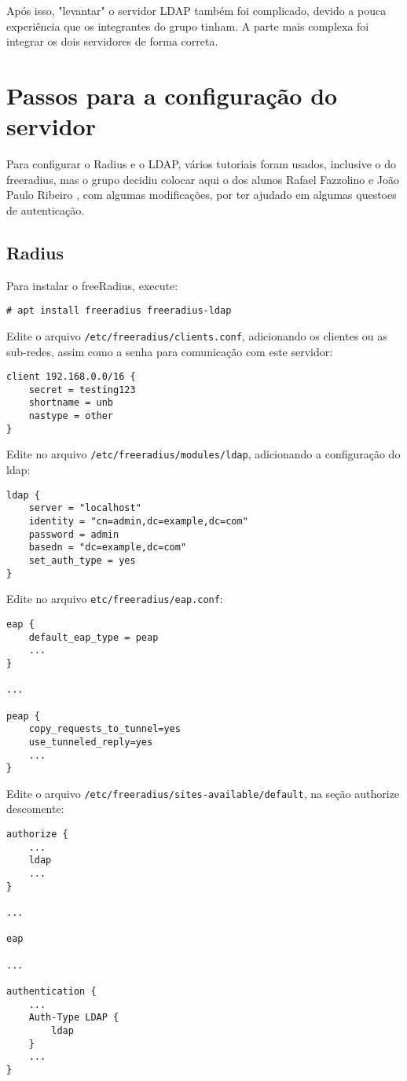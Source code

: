 Após isso, "levantar" o servidor LDAP também foi complicado, devido a pouca
experiência que os integrantes do grupo tinham.
A parte mais complexa foi integrar os dois servidores de forma correta.

\section{Passos para a configuração do servidor}

Para configurar o Radius e o LDAP, vários tutoriais foram usados, inclusive o do
freeradius, mas o grupo decidiu colocar aqui o dos alunos Rafael Fazzolino e João Paulo
Ribeiro \cite{wiki}, com algumas modificações, por ter ajudado em algumas questoes de autenticação.  

\subsection{Radius}

Para instalar o freeRadius, execute:
\begin{verbatim}
# apt install freeradius freeradius-ldap
\end{verbatim}

Edite o arquivo \verb|/etc/freeradius/clients.conf|, adicionando os clientes ou as sub-redes, assim como a senha para comunicação com este servidor:

\begin{verbatim}
client 192.168.0.0/16 {
    secret = testing123
    shortname = unb
    nastype = other
}
\end{verbatim}

Edite no arquivo \verb|/etc/freeradius/modules/ldap|, adicionando a configuração do ldap:

\begin{verbatim}
ldap {
    server = "localhost"
    identity = "cn=admin,dc=example,dc=com"
    password = admin
    basedn = "dc=example,dc=com"
    set_auth_type = yes
}
\end{verbatim}

Edite no arquivo \verb|etc/freeradius/eap.conf|:
\begin{verbatim}
eap {
    default_eap_type = peap
    ...
}

...

peap {
    copy_requests_to_tunnel=yes
    use_tunneled_reply=yes
    ...
}
\end{verbatim}

Edite o arquivo \verb|/etc/freeradius/sites-available/default|, na seção authorize descomente:
\begin{verbatim}
authorize {
    ...
    ldap
    ...
}

...

eap

...

authentication {
    ...
    Auth-Type LDAP {
        ldap
    }
    ...
}
\end{verbatim}

